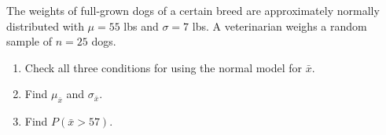 \documentclass[10pt]{article}
\begin{document}
\namedateperiod

\vspace{0.15in}

The weights of full-grown dogs of a certain breed are approximately normally distributed
with $\mu = 55$ lbs and $\sigma = 7$ lbs. A veterinarian weighs a random sample of
$n = 25$ dogs.

\begin{enumerate}
  \item Check all three conditions for using the normal model for $\bar{x}$.

  \item Find $\mu_{\bar{x}}$ and $\sigma_{\bar{x}}$.
        \vspace{0.5in}

  \item Find $P(\bar{x} > 57)$.
        \vspace{0.8in}
\end{enumerate}
\end{document}
